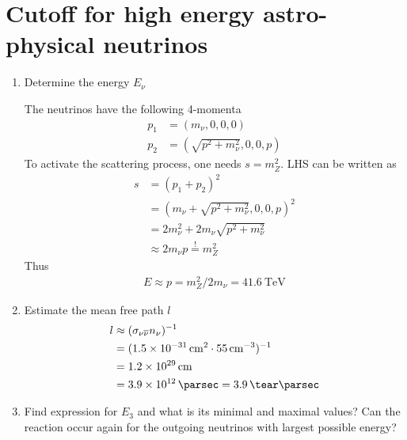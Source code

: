 \section{Cutoff for high energy astro-physical neutrinos}
\begin{enumerate}[label=(\alph*)]
   \item Determine the energy $E_\nu$

      The neutrinos have the following 4-momenta
      \begin{align*}
         p_1 &= (m_\nu, 0, 0, 0)  \\
         p_2 &= (\sqrt{p^2 + m_\nu^2}, 0, 0, p)
      \end{align*}
      To activate the scattering process, one needs $s = m_Z^2$.  LHS can be written as
      \begin{align*}
         s &= (p_1 + p_2)^2 \\
           &= (m_\nu + \sqrt{p^2 + m_\nu^2}, 0, 0, p)^2 \\
           &= 2m_\nu^2 +2m_\nu \sqrt{p^2 + m_\nu^2} \\
           &\approx 2 m_\nu p
           \stackrel{!}= m_Z^2
      \end{align*}
      Thus
      \begin{align}
         E \approx p = m^2_Z / 2m_\nu =  \SI{41.6}{\tera \eV}
      \end{align}
   \item Estimate the mean free path $l$
      \begin{align*}
         l &\approx (\sigma_{\nu \overline{\nu}} n_\nu )^{-1} \\
           &= (\SI{1.5e-31}{\cm \tothe{2}} \cdot \SI{55}{\cm \tothe{-3}})^{-1} \\
           &= \SI{1.2e29}{\cm}  \\
           &= \SI{3.9e12}{\parsec} = \SI{3.9}{\tear \parsec}
      \end{align*}
   \item Find expression for $E_3$ and what is its minimal and maximal values? Can the reaction occur again for the outgoing neutrinos with largest possible energy?


\end{enumerate}

